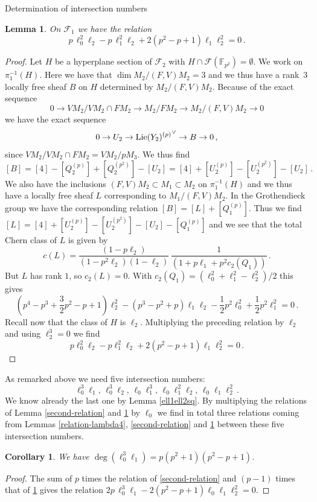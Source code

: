 \documentclass[11pt]{amsart}
\numberwithin{equation}{section}
\newcommand{\FF}{\mathbb F}
\newtheorem{lemma}[theorem]{Lemma}
\newtheorem{corollary}[theorem]{Corollary}
\theoremstyle{definition}
\theoremstyle{remark}
\begin{document}
\begin{section}{Determination of intersection numbers}
\begin{lemma}\label{third-relation}
On $\mathcal{F}_1$ we have the relation
$$
p\, \ell_0^2\ell_2-p\, \ell_1^2\ell_2+2(p^2-p+1)\ell_1\ell_2^2=0 \, .
$$
\end{lemma}
\begin{proof}
Let $H$ be a hyperplane section of $\mathcal{F}_2$ with $H\cap \mathcal{F}({\FF}_{p^2})=\emptyset$.
We work on $\pi_1^{-1}(H)$. Here we have that $\dim M_2/(F,V)M_2=3$ and we thus have a rank~$3$
locally free sheaf $B$ on $H$ determined by $M_2/(F,V)M_2$. Because of the exact sequence
$$
0 \to VM_2/VM_2 \cap FM_2 \to M_2/FM_2 \to M_2/(F,V)M_2 \to 0
$$
we have the exact sequence
$$
0 \to U_2 \to {{\rm Lie}(Y_2)^{(p)}}^{\vee} \to B \to 0\, ,
$$
since $VM_2/VM_2 \cap FM_2 = VM_2/pM_3$. %
We thus find
$$
[B]=[4]-[Q_2^{(p)}]+[Q_2^{(p^2)}]-[U_2]=[4]+[U_2^{(p)}]-[U_2^{(p^2)}]-[U_2]\, .
$$
We also have the inclusions $(F,V)M_2 \subset M_1 \subset M_2$ on $\pi_1^{-1}(H)$ and we thus have
a locally free sheaf $L$ corresponding to $M_1/(F,V)M_2$. In the Grothendieck group we have the
corresponding relation $[B]=[L]+[Q_1^{(p)}]$. Thus we find $[L]=[4]+[U_2^{(p)}]-[U_2^{(p^2)}]-[U_2]-[Q_1^{(p)}]$
and we see that the total Chern class of $L$ is given by
$$
c(L)=\frac{(1-p\ell_2)}{(1-p^2\ell_2)(1-\ell_2)}
\, \frac{1}{(1+p\ell_1+p^2c_2(Q_1))}\, .
$$
But $L$ has rank $1$, so $c_2(L)=0$. With $c_2(Q_1)=(\ell_0^2+\ell_1^2-\ell_2^2)/2$ this gives
$$
(p^4-p^3+\frac{3}{2}p^2-p+1)\ell_2^2-(p^3-p^2+p)\ell_1\ell_2-\frac{1}{2}p^2\ell_0^2
+\frac{1}{2}p^2\ell_1^2=0 \, . 
$$ 
Recall now that the class of $H$ is $\ell_2$. Multiplying the preceding relation by $\ell_2$
and using $\ell_2^3=0$ we find 
$$
p\ell_0^2\ell_2-p\ell_1^2\ell_2+2(p^2-p+1)\ell_1\ell_2^2=0 \, .
$$
\end{proof}
As remarked above we need five intersection numbers:
$$
\ell_0^3\ell_1,\, \ell_0^3\ell_2,\, \ell_0\ell_1^3,\, \ell_0\ell_1^2\ell_2,\, 
\ell_0\ell_1\ell_2^2\, .
$$
We know already the last one by Lemma \ref{ell1ell2sq}.
By multiplying the relations of Lemma \ref{second-relation} and \ref{third-relation} 
 by $\ell_0$ 
we find in total three relations coming from Lemmas 
\ref{relation-lambda4}, \ref{second-relation}
and \ref{third-relation}
 between these five intersection numbers.

\begin{corollary}
We have $\deg(\ell_0^3\ell_1)= p(p^2+1)(p^2-p+1)$.
\end{corollary}
\begin{proof}
The sum of $p$ times the relation of \ref{second-relation} and
$(p-1)$ times that of \ref{third-relation} 
gives the relation 
$2p\, \ell_0^3\ell_1-2(p^2-p+1)\ell_0\ell_1\ell_2^2=0$.
\end{proof}


\end{section}
\end{document}
